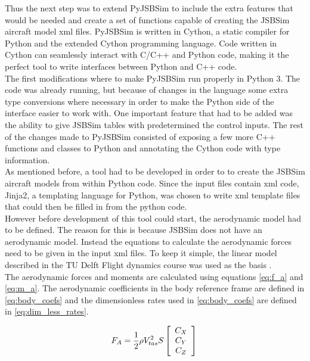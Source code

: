 Thus the next step was to extend PyJSBSim to include the extra features that would be needed and create a set of functions capable of creating the JSBSim aircraft model \gls{xml} files. PyJSBSim is written in Cython, a static compiler for Python and the extended Cython programming language. Code written in Cython can seamlessly interact with C/C++ and Python code, making it the perfect tool to write interfaces between Python and C++ code. \\

The first modifications where to make PyJSBSim run properly in Python 3. The code was already running, but because of changes in the language some extra type conversions where necessary in order to make the Python side of the interface easier to work with. One important feature that had to be added was the ability to give JSBSim tables with predetermined the control inputs. The rest of the changes made to PyJSBSim consisted of exposing a few more C++ functions and classes to Python and annotating the Cython code with type information.\\

As mentioned before, a tool had to be developed in order to to create the JSBSim aircraft models from within Python code. Since the input files contain \gls{xml} code, Jinja2, a templating language for Python, was chosen to write \gls{xml} template files that could then be filled in from the python code. \\

However before development of this tool could start, the aerodynamic model had to be defined. The reason for this is because JSBSim does not have an aerodynamic model. Instead the equations to calculate the aerodynamic forces need to be given in the input \gls{xml} files. To keep it simple, the linear model described in the TU Delft Flight dynamics course was used as the basis \cite{fdreader}. \\

The aerodynamic forces and moments are calculated using equations \autoref{eq:f_a} and \autoref{eq:m_a}. The aerodynamic coefficients in the body reference frame are defined in \autoref{eq:body_coefs} and the dimensionless rates used in \autoref{eq:body_coefs} are defined in \autoref{eq:dim_less_rates}.

\begin{equation}
\label{eq:f_a}
{F_A} = \frac{1}{2}\rho V_{tas}^2S\left[ {\begin{array}{*{20}{c}}
{{C_X}}\\
{{C_Y}}\\
{{C_Z}}
\end{array}} \right]\\
\end{equation}

